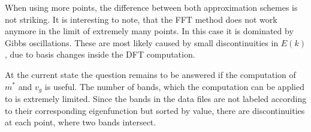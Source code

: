 When using more points, the difference between both approximation schemes is not striking. It is interesting to note, that the FFT method does not work anymore in the limit of extremely many points. In this case it is dominated by Gibbs oscillations. These are most likely caused by small discontinuities in $E(k)$, due to basis changes inside the DFT computation.


At the current state the question remains to be answered if the computation of $m^{*}$ and $v_g$ is
useful. The number of bands, which the computation can be applied to is
extremely limited. Since the bands in the data files are not labeled according to their corresponding eigenfunction but sorted by value, there are discontinuities at each point, where two bands intersect. 













%
%    


